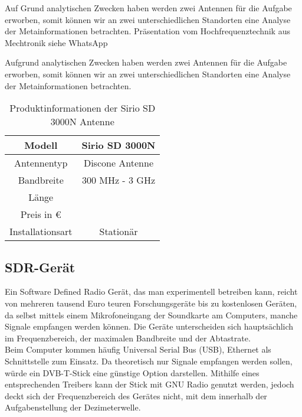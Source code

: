 Auf Grund analytischen Zwecken haben werden zwei Antennen für die Aufgabe erworben, somit können wir an zwei unterschiedlichen Standorten eine Analyse der Metainformationen betrachten.
Präsentation vom Hochfrequenztechnik aus Mechtronik siehe WhatsApp


Aufgrund analytischen Zwecken haben werden zwei Antennen für die Aufgabe erworben, somit können wir an zwei unterschiedlichen Standorten eine Analyse der Metainformationen betrachten. %

\begin{table}[ht]
	\centering
\begin{tabular}{c|c}
	Modell & Sirio SD 3000N \\
	\hline
	Antennentyp & Discone Antenne \\ 
	\hline 
	Bandbreite & 300 MHz - 3 GHz \\ 
	\hline 
	Länge &  \\ 
	\hline 
	Preis in \euro &  \\ 
	\hline 
	Installationsart & Stationär \\ 

\end{tabular} 
	\caption{Produktinformationen der Sirio SD 3000N Antenne}
\end{table}



\subsection{SDR-Gerät} %
Ein Software Defined Radio Gerät, das man experimentell betreiben kann, reicht von mehreren tausend Euro teuren Forschungsgeräte bis zu kostenlosen Geräten, da selbst mittels einem Mikrofoneingang der Soundkarte am Computers, manche Signale empfangen werden können. Die Geräte unterscheiden sich hauptsächlich im Frequenzbereich, der maximalen Bandbreite und der Abtastrate. \\
Beim Computer kommen häufig Universal Serial Bus (USB), Ethernet als Schnittstelle zum  Einsatz.
Da theoretisch nur Signale empfangen werden sollen, würde ein DVB-T-Stick eine günstige Option darstellen. Mithilfe eines entsprechenden Treibers kann der Stick mit GNU Radio genutzt werden, jedoch deckt sich der Frequenzbereich des Gerätes nicht, mit dem innerhalb der Aufgabenstellung der Dezimeterwelle.


